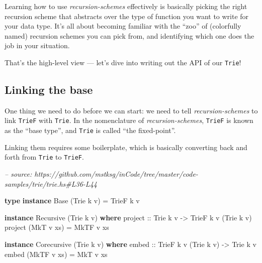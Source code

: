 \documentclass[]{article}
\newenvironment{Shaded}{}{}
\newcommand{\CommentTok}[1]{\textcolor[rgb]{0.38,0.63,0.69}{\textit{#1}}}
\newcommand{\DataTypeTok}[1]{\textcolor[rgb]{0.56,0.13,0.00}{#1}}
\newcommand{\FunctionTok}[1]{\textcolor[rgb]{0.02,0.16,0.49}{#1}}
\newcommand{\KeywordTok}[1]{\textcolor[rgb]{0.00,0.44,0.13}{\textbf{#1}}}
\newcommand{\NormalTok}[1]{#1}
\newcommand{\OtherTok}[1]{\textcolor[rgb]{0.00,0.44,0.13}{#1}}
\begin{document}
Learning how to use \emph{recursion-schemes} effectively is basically picking
the right recursion scheme that abstracts over the type of function you want to
write for your data type. It's all about becoming familiar with the ``zoo'' of
(colorfully named) recursion schemes you can pick from, and identifying which
one does the job in your situation.

That's the high-level view --- let's dive into writing out the API of our
\texttt{Trie}!

\hypertarget{linking-the-base}{%
\subsection{Linking the base}\label{linking-the-base}}

One thing we need to do before we can start: we need to tell
\emph{recursion-schemes} to link \texttt{TrieF} with \texttt{Trie}. In the
nomenclature of \emph{recursion-schemes}, \texttt{TrieF} is known as the ``base
type'', and \texttt{Trie} is called ``the fixed-point''.

Linking them requires some boilerplate, which is basically converting back and
forth from \texttt{Trie} to \texttt{TrieF}.

\begin{Shaded}
\begin{Highlighting}[]
\CommentTok{-- source: https://github.com/mstksg/inCode/tree/master/code-samples/trie/trie.hs#L36-L44}

\KeywordTok{type} \KeywordTok{instance} \DataTypeTok{Base}\NormalTok{ (}\DataTypeTok{Trie}\NormalTok{ k v) }\FunctionTok{=} \DataTypeTok{TrieF}\NormalTok{ k v}

\KeywordTok{instance} \DataTypeTok{Recursive}\NormalTok{ (}\DataTypeTok{Trie}\NormalTok{ k v) }\KeywordTok{where}
\OtherTok{    project ::} \DataTypeTok{Trie}\NormalTok{ k v }\OtherTok{->} \DataTypeTok{TrieF}\NormalTok{ k v (}\DataTypeTok{Trie}\NormalTok{ k v)}
\NormalTok{    project (}\DataTypeTok{MkT}\NormalTok{ v xs) }\FunctionTok{=} \DataTypeTok{MkTF}\NormalTok{ v xs}

\KeywordTok{instance} \DataTypeTok{Corecursive}\NormalTok{ (}\DataTypeTok{Trie}\NormalTok{ k v) }\KeywordTok{where}
\OtherTok{    embed ::} \DataTypeTok{TrieF}\NormalTok{ k v (}\DataTypeTok{Trie}\NormalTok{ k v) }\OtherTok{->} \DataTypeTok{Trie}\NormalTok{ k v}
\NormalTok{    embed (}\DataTypeTok{MkTF}\NormalTok{ v xs) }\FunctionTok{=} \DataTypeTok{MkT}\NormalTok{ v xs}
\end{Highlighting}
\end{Shaded}
\end{document}
